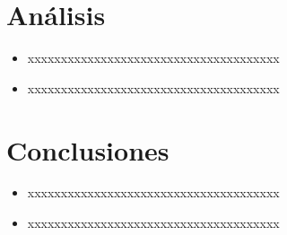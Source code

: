 \documentclass[%
 reprint,
 amsmath,amssymb,
 aps,
]{revtex4-1}
\begin{document}
\section{Análisis}

\begin{itemize}
\item xxxxxxxxxxxxxxxxxxxxxxxxxxxxxxxxxxxxxx 
\item xxxxxxxxxxxxxxxxxxxxxxxxxxxxxxxxxxxxxx 
\end{itemize}
\section{Conclusiones}

\begin{itemize}
\item xxxxxxxxxxxxxxxxxxxxxxxxxxxxxxxxxxxxxx 
\item xxxxxxxxxxxxxxxxxxxxxxxxxxxxxxxxxxxxxx 

\end{itemize}






\end{document}

